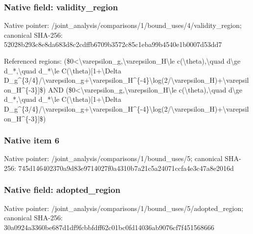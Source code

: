 \documentclass[10pt,a4paper]{article}
\begin{document}
\subsubsection{Native field: validity\_\allowbreak{}region}
Native pointer: /joint\_\allowbreak{}analysis/comparisons/1/bound\_\allowbreak{}uses/4/validity\_\allowbreak{}region; canonical SHA-256: 52028b293c8e8da683d8c2cdffb6709b3572c85c1eba99b4540e1b0007d53dd7

\begingroup\raggedright\sloppy Referenced regions:\allowbreak{} (\$0<\textbackslash{}varepsilon\_\allowbreak{}g,\allowbreak{}\textbackslash{}varepsilon\_\allowbreak{}H\textbackslash{}le c(\textbackslash{}theta),\allowbreak{}\textbackslash{}quad d\textbackslash{}ge d\_\allowbreak{}*,\allowbreak{}\textbackslash{}quad d\_\allowbreak{}*\textbackslash{}le C(\textbackslash{}theta)[1+\textbackslash{}Delta D\_\allowbreak{}g\textasciicircum{}\{3/\allowbreak{}4\}/\allowbreak{}\textbackslash{}varepsilon\_\allowbreak{}g+\textbackslash{}varepsilon\_\allowbreak{}H\textasciicircum{}\{-4\}\textbackslash{}log(2/\allowbreak{}\textbackslash{}varepsilon\_\allowbreak{}H)+\textbackslash{}varepsilon\_\allowbreak{}H\textasciicircum{}\{-3\}]\$) AND (\$0<\textbackslash{}varepsilon\_\allowbreak{}g,\allowbreak{}\textbackslash{}varepsilon\_\allowbreak{}H\textbackslash{}le c(\textbackslash{}theta),\allowbreak{}\textbackslash{}quad d\textbackslash{}ge d\_\allowbreak{}*,\allowbreak{}\textbackslash{}quad d\_\allowbreak{}*\textbackslash{}le C(\textbackslash{}theta)[1+\textbackslash{}Delta D\_\allowbreak{}g\textasciicircum{}\{3/\allowbreak{}4\}/\allowbreak{}\textbackslash{}varepsilon\_\allowbreak{}g+\textbackslash{}varepsilon\_\allowbreak{}H\textasciicircum{}\{-4\}\textbackslash{}log(2/\allowbreak{}\textbackslash{}varepsilon\_\allowbreak{}H)+\textbackslash{}varepsilon\_\allowbreak{}H\textasciicircum{}\{-3\}]\$)\par\endgroup

\subsubsection{Native item 6}
Native pointer: /joint\_\allowbreak{}analysis/comparisons/1/bound\_\allowbreak{}uses/5; canonical SHA-256: 745d146402370a9d83e9714027f0a4310b7a21c5a24071ccfa4e3c47a8e2016d

\subsubsection{Native field: adopted\_\allowbreak{}region}
Native pointer: /joint\_\allowbreak{}analysis/comparisons/1/bound\_\allowbreak{}uses/5/adopted\_\allowbreak{}region; canonical SHA-256: 30a0924a3360be687d1df9fcbbfdff62c01bc0fd14036ab9076cf7f451568666
\end{document}
